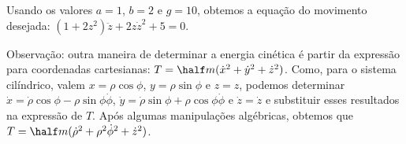 \begin{question}
\begin{solution}
		Usando os valores $a = 1$, $b = 2$ e $g = 10$, obtemos a equação do movimento desejada: %
		$(1 + 2z^2) \ddot z + 2z\dot z^2 + 5 = 0$. %

		Observação: outra maneira de determinar a energia cinética é partir da expressão para coordenadas cartesianas: $T = \half m (\dot x^2 + \dot y^2 + \dot z^2)$.
		Como, para o sistema cilíndrico, valem $x = \rho\cos\phi$, $y = \rho\sin\phi$ e $z = z$, podemos determinar $\dot x = \dot\rho \cos\phi - \rho\sin\phi \dot \phi$, $\dot y = \dot\rho \sin\phi + \rho\cos\phi \dot \phi$ e $\dot z = \dot z$ e substituir esses resultados na expressão de $T$. Após algumas manipulações algébricas, obtemos que $T = \half m (\dot\rho^2 + \rho^2\dot\phi^2 + \dot z^2)$. 
	\end{solution}
\end{question}